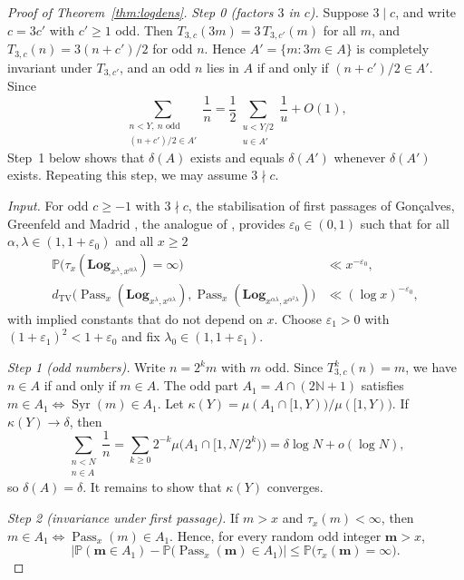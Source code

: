 \documentclass[12pt]{amsart}
\theoremstyle{definition}
\theoremstyle{remark}
\newcommand{\N}{\mathbb{N}}
\begin{document}
\begin{proof}[Proof of Theorem~\ref{thm:logdens}]
\emph{Step 0 (factors $3$ in $c$).} Suppose $3\mid c$, and write $c=3c'$ with $c'\ge1$ odd. Then $T_{3,c}(3m)=3\,T_{3,c'}(m)$ for all $m$, and $T_{3,c}(n)=3(n+c')/2$ for odd $n$. Hence $A'=\{m:3m\in A\}$ is completely invariant under $T_{3,c'}$, and an odd $n$ lies in $A$ if and only if $(n+c')/2\in A'$. Since
\[
\sum_{\substack{n<Y,\ n\text{ odd}\\ (n+c')/2\in A'}}\frac1n=\frac12\sum_{\substack{u<Y/2\\ u\in A'}}\frac1u+O(1),
\]
Step~1 below shows that $\delta(A)$ exists and equals $\delta(A')$ whenever $\delta(A')$ exists. Repeating this step, we may assume $3\nmid c$.

\emph{Input.} For odd $c\ge-1$ with $3\nmid c$, the stabilisation of first passages of Gon\c{c}alves, Greenfeld and Madrid \cite[Proposition~3.5]{GGM_2025}, the analogue of \cite[Proposition~1.11]{Tao_2022}, provides $\varepsilon_0\in(0,1)$ such that for all $\alpha,\lambda\in(1,1+\varepsilon_0)$ and all $x\ge2$
\begin{align}
\mathbb P\bigl(\tau_x(\mathbf{Log}_{x^\lambda,x^{\alpha\lambda}})=\infty\bigr)&\ll x^{-\varepsilon_0},\label{eq:ggm_hit}\\
d_{\mathrm{TV}}\bigl(\operatorname{Pass}_x(\mathbf{Log}_{x^\lambda,x^{\alpha\lambda}}),\operatorname{Pass}_x(\mathbf{Log}_{x^{\alpha\lambda},x^{\alpha^2\lambda}})\bigr)&\ll(\log x)^{-\varepsilon_0},\label{eq:ggm_tv}
\end{align}
with implied constants that do not depend on $x$. Choose $\varepsilon_1>0$ with $(1+\varepsilon_1)^2<1+\varepsilon_0$ and fix $\lambda_0\in(1,1+\varepsilon_1)$.

\emph{Step 1 (odd numbers).} Write $n=2^km$ with $m$ odd. Since $T_{3,c}^k(n)=m$, we have $n\in A$ if and only if $m\in A$. The odd part $A_1=A\cap(2\N+1)$ satisfies $m\in A_1\iff\operatorname{Syr}(m)\in A_1$. Let $\kappa(Y)=\mu(A_1\cap[1,Y))/\mu([1,Y))$. If $\kappa(Y)\to\delta$, then
\[
\sum_{\substack{n<N\\ n\in A}}\frac1n=\sum_{k\ge0}2^{-k}\mu\bigl(A_1\cap[1,N/2^k)\bigr)=\delta\log N+o(\log N),
\]
so $\delta(A)=\delta$. It remains to show that $\kappa(Y)$ converges.

\emph{Step 2 (invariance under first passage).} If $m>x$ and $\tau_x(m)<\infty$, then $m\in A_1\iff\operatorname{Pass}_x(m)\in A_1$. Hence, for every random odd integer $\mathbf m>x$,
\begin{equation}
\label{eq:passage}
\bigl|\mathbb P(\mathbf m\in A_1)-\mathbb P\bigl(\operatorname{Pass}_x(\mathbf m)\in A_1\bigr)\bigr|\le\mathbb P\bigl(\tau_x(\mathbf m)=\infty\bigr).
\end{equation}


\end{proof}
\end{document}
